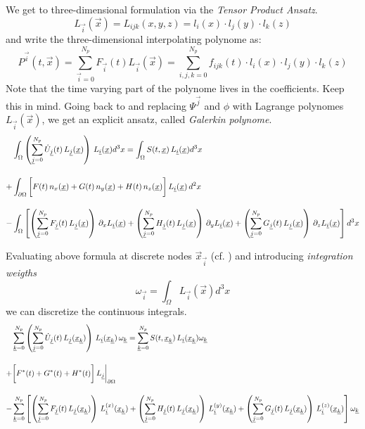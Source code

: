 We get to three-dimensional formulation via the \emph{Tensor Product Ansatz}.
\newcommand{\LI}{L_{\vec{i}}(\vec{x})}
\begin{equation}
\label{eq-tensor-ansatz}
    \LI = L_{ijk}(x,y,z) = l_i(x) \cdot l_j(y) \cdot l_k(z)
\end{equation}
and write the three-dimensional interpolating polynome as:
\newcommand{\PI}{P^{\vec{i}}(t,\vec{x})}
\newcommand{\FI}{F_{\vec{i}}(t)}
\newcommand{\sumI}{\sum^{N_p}_{\vec{i}=0}}
\begin{equation}
\label{eq-tensor-ansatz}
    \PI = \sumI \FI \LI = \sum^{N_p}_{i,j,k = 0} f_{ijk}(t) \cdot l_i(x) \cdot l_j(y) \cdot l_k(z)
\end{equation}
Note that the time varying part of the polynome lives in the coefficients.
Keep this in mind.
\newcommand{\FJ}{F_{\vec{j}}(t)}
\newcommand{\GJ}{G_{\vec{j}}(t)}
\newcommand{\HJ}{H_{\vec{j}}(t)}
\newcommand{\STX}{S(t,\vec{x})}
\newcommand{\UJ}{ \dot{U}_{\vec{j}}(t)}
\newcommand{\LJ}{L_{\vec{j}}(\vec{x})}
\newcommand{\sumJ}{\sum^{N_p}_{\vec{j}=0}}
\newcommand{\nx}{n_x(\vec{x})}
\newcommand{\ny}{n_y(\vec{x})}
\newcommand{\nz}{n_z(\vec{x})}
Going back to  and replacing $\Psi^{\vec{j}}$
and $\phi$ with Lagrange polynomes $\LI$, we get an explicit ansatz, called
\emph{Galerkin polynome}.
\begin{align}
     &\int_\Omega \left(\sumJ \UJ \, \LJ \right) \, \LI d^3x = \int_\Omega \STX \, \LI d^3x \nonumber \br
    +&\int_{\partial\Omega} \bigg[ F(t) \, \nx + G(t) \, \ny + H(t)\, \nz \bigg]\,\LI\, d^2x \br
    -&\int_\Omega \left[
          \left(\sumJ \FJ \, \LJ \right) \, \partial_x \LI 
        + \left(\sumJ \HJ \, \LJ \right) \, \partial_y \LI
        + \left(\sumJ \GJ \, \LJ \right) \, \partial_z \LI \right] d^3x \nonumber
\end{align}

\newcommand{\sumK}{\sum^{N_p}_{\vec{k}=0}}
\newcommand{\wK}{\omega_{\vec{k}}}

\newcommand{\STXK}{S(t,\vec{x}_{\vec{k}})}
\newcommand{\LIK}{L_{\vec{i}}(\vec{x}_{\vec{k}})}
\newcommand{\LJK}{L_{\vec{j}}(\vec{x}_{\vec{k}})}

\newcommand{\LXIK}{L^{(x)}_{\vec{i}}(\vec{x}_{\vec{k}})}
\newcommand{\LYIK}{L^{(y)}_{\vec{i}}(\vec{x}_{\vec{k}})}
\newcommand{\LZIK}{L^{(z)}_{\vec{i}}(\vec{x}_{\vec{k}})}

Evaluating above formula at discrete nodes $\vec{x}_{\vec{i}}$ (cf.
) and introducing \emph{integration weigths}
\begin{equation}
\label{eqn:mass-matrix}
    \omega_{\vec{i}} = \int_{\Omega} \LI d^3 x
\end{equation}
we can discretize the continuous integrals.
\begin{align}
     &\sumK \left(\sumJ \UJ \, \LJK \right) \, \LIK \,\wK = \sumK \STXK \, \LIK \wK \nonumber \br
    +&\bigg[ F^*(t) + G^*(t) + H^*(t)\bigg] \, L_{\vec{j}}\bigg|_{\partial\Omega} \br
    -&\sumK \left[
          \left(\sumJ \FJ \, \LJK \right) \, \LXIK 
        + \left(\sumJ \HJ \, \LJK \right) \, \LYIK
        + \left(\sumJ \GJ \, \LJK \right) \, \LZIK \right] \wK \nonumber
\end{align}

